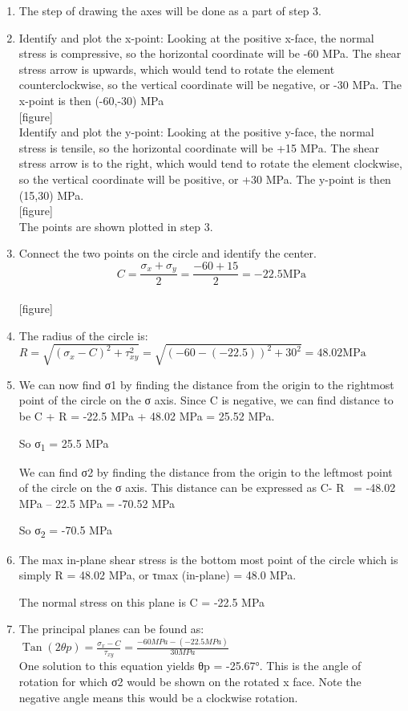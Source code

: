 \documentclass[
  letterpaper,
  DIV=11,
  numbers=noendperiod]{scrreprt}
\begin{document}
\begin{tcolorbox}
\begin{tcolorbox}
\begin{enumerate}
\def\labelenumi{\arabic{enumi}.}
\item
  The step of drawing the axes will be done as a part of step 3.
\item
  Identify and plot the x-point: Looking at the positive x-face, the
  normal stress is compressive, so the horizontal coordinate will be -60
  MPa. The shear stress arrow is upwards, which would tend to rotate the
  element counterclockwise, so the vertical coordinate will be negative,
  or -30 MPa. The x-point is then (-60,-30) MPa\\
  {[}figure{]}\\
  Identify and plot the y-point: Looking at the positive y-face, the
  normal stress is tensile, so the horizontal coordinate will be +15
  MPa. The shear stress arrow is to the right, which would tend to
  rotate the element clockwise, so the vertical coordinate will be
  positive, or +30 MPa. The y-point is then (15,30) MPa.\\
  {[}figure{]}\\
  The points are shown plotted in step 3.
\item
  Connect the two points on the circle and identify the center.\\
  \[
  C=\frac{\sigma_x+\sigma_y}{2}=\frac{-60+15}{2}=-22.5 \mathrm{MPa}
  \]\\
  {[}figure{]}
\item
  The radius of the circle is:
  \(R=\sqrt{\left(\sigma_x-C\right)^2+\tau_{x y}^2}=\sqrt{(-60-(-22.5))^2+30^2}=48.02 \mathrm{MPa}\)
\item
  We can now find σ1 by finding the distance from the origin to the
  rightmost point of the circle on the σ axis. Since C is negative, we
  can find distance to be C + R = -22.5 MPa + 48.02 MPa = 25.52 MPa.

  So σ\textsubscript{1} = 25.5 MPa

  We can find σ2 by finding the distance from the origin to the leftmost
  point of the circle on the σ axis. This distance can be expressed as
  C- R ~= -48.02 MPa -- 22.5 MPa = -70.52 MPa

  So σ\textsubscript{2} = -70.5 MPa
\item
  The max in-plane shear stress is the bottom most point of the circle
  which is simply R = 48.02 MPa, or τmax (in-plane) = 48.0 MPa.

  The normal stress on this plane is C = -22.5 MPa
\item
  The principal planes can be found as:
  \(\operatorname{Tan}(2 \theta p)=\frac{\sigma_x-C}{\tau_{x y}}=\frac{-60 M P a-(-22.5 M P a)}{30 M P a}\)\\
  One solution to this equation yields θp = -25.67°. This is the angle
  of rotation for which σ2 would be shown on the rotated x face. Note
  the negative angle means this would be a clockwise rotation.


\end{enumerate}
\end{tcolorbox}
\end{tcolorbox}
\end{document}
